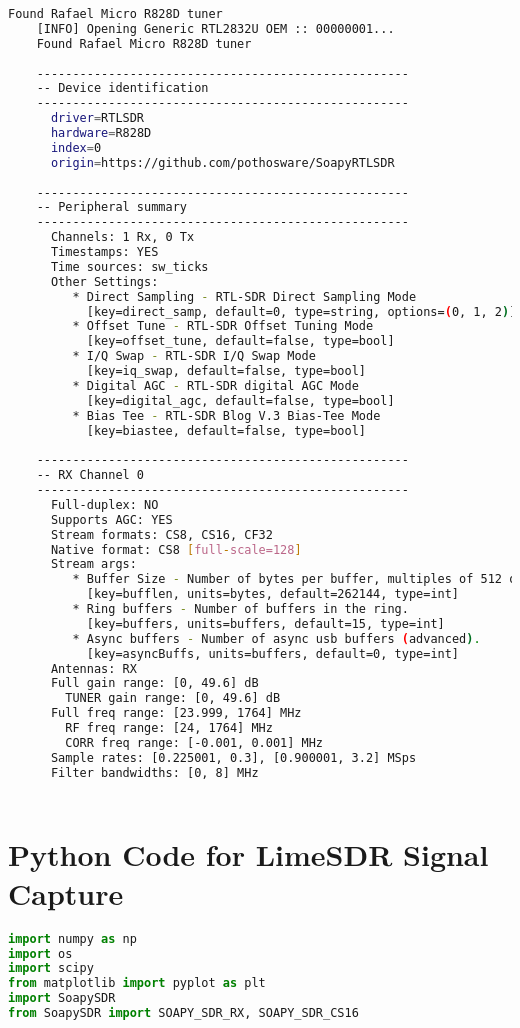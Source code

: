 \begin{appendices}
\begin{lstlisting}[language=bash, caption={SoapySDRUtil Probe Output for RTL-SDR}, label={lst: soapyProbeRTL}]
    Found Rafael Micro R828D tuner
    [INFO] Opening Generic RTL2832U OEM :: 00000001...
    Found Rafael Micro R828D tuner
    
    ----------------------------------------------------
    -- Device identification
    ----------------------------------------------------
      driver=RTLSDR
      hardware=R828D
      index=0
      origin=https://github.com/pothosware/SoapyRTLSDR
    
    ----------------------------------------------------
    -- Peripheral summary
    ----------------------------------------------------
      Channels: 1 Rx, 0 Tx
      Timestamps: YES
      Time sources: sw_ticks
      Other Settings:
         * Direct Sampling - RTL-SDR Direct Sampling Mode
           [key=direct_samp, default=0, type=string, options=(0, 1, 2)]
         * Offset Tune - RTL-SDR Offset Tuning Mode
           [key=offset_tune, default=false, type=bool]
         * I/Q Swap - RTL-SDR I/Q Swap Mode
           [key=iq_swap, default=false, type=bool]
         * Digital AGC - RTL-SDR digital AGC Mode
           [key=digital_agc, default=false, type=bool]
         * Bias Tee - RTL-SDR Blog V.3 Bias-Tee Mode
           [key=biastee, default=false, type=bool]
    
    ----------------------------------------------------
    -- RX Channel 0
    ----------------------------------------------------
      Full-duplex: NO
      Supports AGC: YES
      Stream formats: CS8, CS16, CF32
      Native format: CS8 [full-scale=128]
      Stream args:
         * Buffer Size - Number of bytes per buffer, multiples of 512 only.
           [key=bufflen, units=bytes, default=262144, type=int]
         * Ring buffers - Number of buffers in the ring.
           [key=buffers, units=buffers, default=15, type=int]
         * Async buffers - Number of async usb buffers (advanced).
           [key=asyncBuffs, units=buffers, default=0, type=int]
      Antennas: RX
      Full gain range: [0, 49.6] dB
        TUNER gain range: [0, 49.6] dB
      Full freq range: [23.999, 1764] MHz
        RF freq range: [24, 1764] MHz
        CORR freq range: [-0.001, 0.001] MHz
      Sample rates: [0.225001, 0.3], [0.900001, 3.2] MSps
      Filter bandwidths: [0, 8] MHz
    

\end{lstlisting}


\section{Python Code for LimeSDR Signal Capture \label{app:limeSDRscript}}
\begin{lstlisting}[language=Python, caption={Python code for capturing DAB signal using LimeSDR}, label={lst:limeSDR_code}]
import numpy as np
import os
import scipy
from matplotlib import pyplot as plt
import SoapySDR
from SoapySDR import SOAPY_SDR_RX, SOAPY_SDR_CS16


\end{lstlisting}
\end{appendices}
